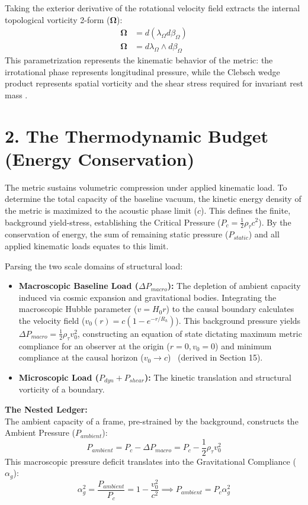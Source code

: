 Taking the exterior derivative of the rotational velocity field extracts the internal topological vorticity 2-form ($\boldsymbol{\Omega}$):
\begin{align}
    \boldsymbol{\Omega} &= d(\lambda_\Omega d\beta_\Omega) \nonumber \\ 
    \boldsymbol{\Omega} &= d\lambda_\Omega \wedge d\beta_\Omega \label{eq:tensor_vorticity} 
\end{align}
This parametrization represents the kinematic behavior of the metric: the irrotational phase represents longitudinal pressure, while the Clebsch wedge product represents spatial vorticity and the shear stress required for invariant rest mass \cite{Volovik2003}. 


\section*{2. The Thermodynamic Budget (Energy Conservation)} 
The metric sustains volumetric compression under applied kinematic load. To determine the total capacity of the baseline vacuum, the kinetic energy density of the metric is maximized to the acoustic phase limit ($c$). This defines the finite, background yield-stress, establishing the Critical Pressure ($P_c = \frac{1}{2}\rho_\tau c^2$). By the conservation of energy, the sum of remaining static pressure ($P_{static}$) and all applied kinematic loads equates to this limit. 

Parsing the two scale domains of structural load:
\begin{itemize}
    \item \textbf{Macroscopic Baseline Load ($\Delta P_{macro}$):} The depletion of ambient capacity induced via cosmic expansion and gravitational bodies. Integrating the macroscopic Hubble parameter ($v = H_0 r$) to the causal boundary calculates the velocity field ($v_0(r) = c(1 - e^{-r/R_h})$). This background pressure yields $\Delta P_{macro} = \frac{1}{2}\rho_\tau v_0^2$, constructing an equation of state dictating maximum metric compliance for an observer at the origin ($r=0, v_0=0$) and minimum compliance at the causal horizon ($v_0 \to c$)~\cite{BairMosheh2026} (derived in Section 15). 
    \item \textbf{Microscopic Load ($P_{dyn} + P_{shear}$):} The kinetic translation and structural vorticity of a boundary.
\end{itemize}

\textbf{The Nested Ledger:}\\
The ambient capacity of a frame, pre-strained by the background, constructs the Ambient Pressure ($P_{ambient}$): 
\begin{equation}
    P_{ambient} = P_c - \Delta P_{macro} = P_c - \frac{1}{2}\rho_\tau v_0^2
\end{equation}
This macroscopic pressure deficit translates into the Gravitational Compliance ($\alpha_g$):
\begin{equation}
    \alpha_g^2 = \frac{P_{ambient}}{P_c} = 1 - \frac{v_0^2}{c^2} \implies P_{ambient} = P_c \alpha_g^2
\end{equation}

